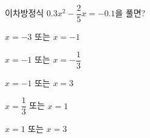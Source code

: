 이차방정식 $0.3x^2-\dfrac{2}{5}x=-0.1$을 풀면?
\begin{choicesii}{\rule[-3ex]{0pt}{8ex}$x=-3$ 또는 $x=-1$}{\rule[-3ex]{0pt}{8ex}$x=-1$ 또는 $x=-\dfrac{1}{3}$}{\rule[-3ex]{0pt}{8ex}$x=-1$ 또는 $x=3$}{\rule[-3ex]{0pt}{8ex}$x=\dfrac{1}{3}$ 또는 $x=1$}{\rule[-3ex]{0pt}{8ex}$x=1$ 또는 $x=3$}\end{choicesii}
